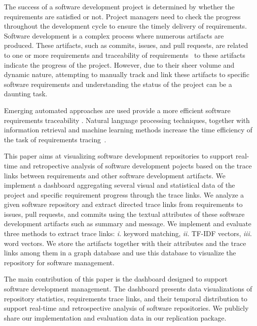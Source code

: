 %
The success of a software development project is determined by whether the requirements are satisfied or not. Project managers need to check the progress throughout the development cycle to ensure the timely delivery of requirements. Software development is a complex process where numerous artifacts are produced. These artifacts, such as commits, issues, and pull requests, are related to one or more requirements and traceability of requirements~\cite{gotel-1994} to these artifacts indicate the progress of the project. However, due to their sheer volume and dynamic nature, attempting to manually track and link these artifacts to specific software requirements and understanding the status of the project can be a daunting task.

%
Emerging automated approaches are used provide a more efficient software requirements traceability \cite{cleland-huang-2007,mills-2017,VANOOSTEN2023107226,bonner-2023,deen-2023}. Natural language processing techniques, together with information retrieval and machine learning methods increase the time efficiency of the task of requirements tracing~\cite{cleland-huang-2007}.

%
This paper aims at visualizing software development repositories to support real-time and retropective analysis of software development pojects based on the trace links between requirements and other software development artifacts. We implement a dashboard aggregating several visual and statistical data of the project and specific requirement progress through the trace links. We analyze a given software repository and extract directed trace links from requirements to issues, pull requests, and commits using the textual attributes of these software development artifacts such as summary and message. We implement and evaluate three methods to extract trace links: \emph{i.} keyword matching, \emph{ii.} TF-IDF vectors, \emph{iii.} word vectors. We store the artifacts together with their attributes and the trace links among them in a graph database and use this database to visualize the repository for software management.

The main contribution of this paper is the dashboard designed to support software development management. The dashboard presents data visualizations of repository statistics, requirements trace links, and their temporal distribution to support real-time and retrospective analysis of software repositories. We publicly share our implementation and evaluation data in our replication package.















